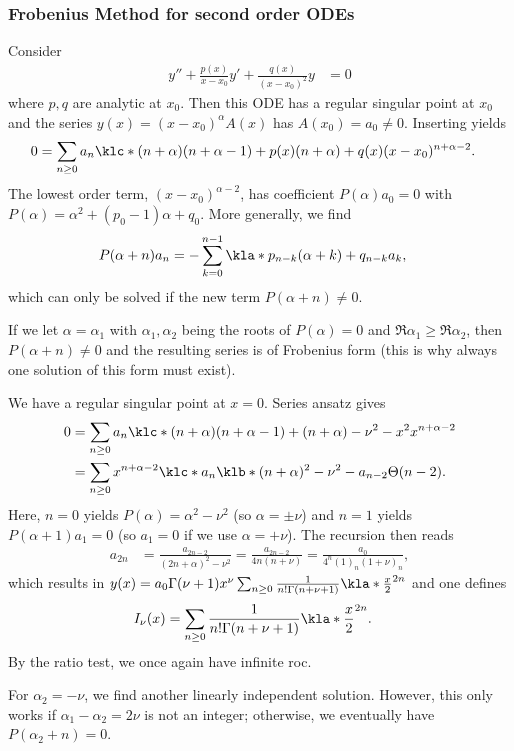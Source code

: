 \documentclass[english, parskip=full]{scrbook}
\newcommand{\note}[1]{\begin{tcolorbox}[colback=colorbackgroundnote,colframe=colornote, breakable,enhanced]#1\end{tcolorbox}}
\newcommand{\example}[3]{\begin{tcolorbox}[colback=colorbackgroundexample,colframe=colorexample, breakable,enhanced,title={\textbf{#1}: #2.}]#3\end{tcolorbox}}
\begin{document}
\subsubsection{Frobenius Method for second order ODEs}
Consider 
\begin{align}
y'' + \frac{p(x)}{x-x_0}y' + \frac{q(x)}{(x-x_0)^2}y &= 0
\end{align}
where $p,q$ are analytic at $x_0$.
Then this ODE has a regular singular point at $x_0$ and the series $y(x) = (x-x_0)^\alpha A(x)$ has $A(x_0)=a_0\neq 0$.
Inserting yields
\begin{align}
0 &= \sum_{n\ge 0} a_n \klc*{(n+\alpha)(n+\alpha-1) + p(x) (n+\alpha) + q(x)} (x-x_0)^{n+\alpha-2}.
\end{align}
The lowest order term, $(x-x_0)^{\alpha-2}$, has coefficient $P(\alpha) a_0 = 0$ with $P(\alpha) = \alpha^2 + (p_0-1)\alpha + q_0$.
More generally, we find
\begin{align}
P(\alpha+n)a_n &= -\sum_{k=0}^{n-1} \kla*{p_{n-k} (\alpha+k) + q_{n-k}}a_k,
\end{align}
which can only be solved if the new term $P(\alpha+n) \neq 0$.
\note{If we let $\alpha=\alpha_1$ with $\alpha_1,\alpha_2$ being the roots of $P(\alpha)=0$ and $\Re \alpha_1 \ge \Re \alpha_2$, then $P(\alpha+n)\neq 0$ and the resulting series is of Frobenius form (this is why always one solution of this form must exist).}
\example{Modified Bessel equation}{$y'' + \frac{1}{x}y' - \kla*{1 + \frac{\nu^2}{x^2}}y = 0$}{We have a regular singular point at $x=0$.
Series ansatz gives
\begin{align}
0 &= \sum_{n\ge 0} a_n \klc*{(n+\alpha)(n+\alpha-1) + (n+\alpha) - \nu^2 - x^2} x^{n+\alpha-2}\\
&= \sum_{n\ge 0} x^{n+\alpha-2} \klc*{a_n \klb*{(n+\alpha)^2-\nu^2} - a_{n-2} \Theta(n-2)}.
\end{align}
Here, $n=0$ yields $P(\alpha)=\alpha^2-\nu^2$ (so $\alpha = \pm \nu$) and $n=1$ yields $P(\alpha+1)a_1 = 0$ (so $a_1=0$ if we use $\alpha=+\nu$).
The recursion then reads
\begin{align}
a_{2n} &= \frac{a_{2n-2}}{(2n+\alpha)^2-\nu^2} = \frac{a_{2n-2}}{4n(n+\nu)} = \frac{a_0}{4^n (1)_n (1+\nu)_n},
\end{align}
which results in $y(x) = a_0 \Gamma(\nu+1) x^\nu \sum_{n\ge 0} \frac{1}{n!\Gamma(n+\nu+1)} \kla*{\frac{x}{2}}^{2n}$ and one defines
\begin{align}
I_\nu(x) &= \sum_{n\ge 0} \frac{1}{n!\Gamma(n+\nu+1)} \kla*{\frac{x}{2}}^{2n}.
\end{align}
By the ratio test, we once again have infinite \gls{roc}.

For $\alpha_2=-\nu$, we find another linearly independent solution.
However, this only works if $\alpha_1-\alpha_2=2\nu$ is not an integer; otherwise, we eventually have $P(\alpha_2+n)=0$.
}
\end{document}
